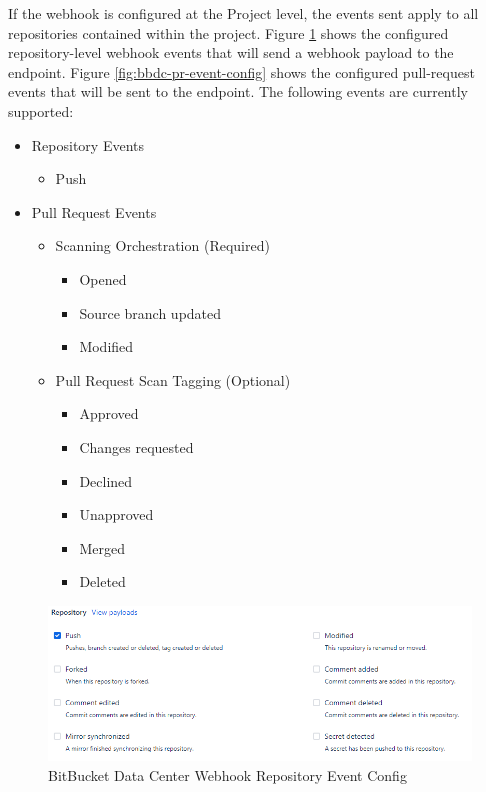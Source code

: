 If the webhook is configured at the Project level, the events sent apply to all repositories contained
within the project.  Figure \ref{fig:bbdc-repo-event-config} shows the configured repository-level webhook 
events that will send a webhook payload to the \cxoneflow endpoint. 
Figure \ref{fig:bbdc-pr-event-config} shows the configured pull-request events that will be sent to 
the \cxoneflow endpoint.  The following events are currently supported:


\pagebreak
\begin{itemize}
    \item Repository Events
        \begin{itemize}
            \item Push
        \end{itemize}
    \item Pull Request Events
        \begin{itemize}
            \item Scanning Orchestration (Required)
                \begin{itemize}
                    \item Opened
                    \item Source branch updated
                    \item Modified
                \end{itemize}
        \end{itemize}
        \begin{itemize}
            \item Pull Request Scan Tagging (Optional)
                \begin{itemize}
                    \item Approved
                    \item Changes requested
                    \item Declined
                    \item Unapproved
                    \item Merged
                    \item Deleted
                \end{itemize}
        \end{itemize}

\end{itemize}


\begin{figure}[h]
    \includegraphics[width=\textwidth]{graphics/bbdc-repository-event-config.png}
    \caption{BitBucket Data Center Webhook Repository Event Config}
    \label{fig:bbdc-repo-event-config}
\end{figure}

